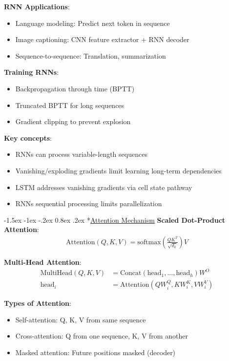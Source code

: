 \documentclass{article}
\makeatletter
\renewcommand\section{\@startsection{section}{1}{\z@}%
                                  {-1.5ex \@plus -1ex \@minus -.2ex}%
                                  {0.8ex \@plus.2ex}%
                                  {\normalfont\small\bfseries}}
\makeatother
\begin{document}
\begin{multicols}{3}
\textbf{RNN Applications}:
\begin{itemize}
\item Language modeling: Predict next token in sequence
\item Image captioning: CNN feature extractor + RNN decoder
\item Sequence-to-sequence: Translation, summarization
\end{itemize}

\textbf{Training RNNs}:
\begin{itemize}
\item Backpropagation through time (BPTT)
\item Truncated BPTT for long sequences
\item Gradient clipping to prevent explosion
\end{itemize}

\textbf{Key concepts}:
\begin{itemize}
\item RNNs can process variable-length sequences
\item Vanishing/exploding gradients limit learning long-term dependencies
\item LSTM addresses vanishing gradients via cell state pathway
\item RNNs sequential processing limits parallelization
\end{itemize}

\section*{\underline{Attention Mechanism}}
\textbf{Scaled Dot-Product Attention}:
\begin{align*}
\text{Attention}(Q, K, V) = \text{softmax}\left(\frac{QK^T}{\sqrt{d_k}}\right)V
\end{align*}

\textbf{Multi-Head Attention}:
\begin{align*}
\text{MultiHead}(Q, K, V) &= \text{Concat}(\text{head}_1,...,\text{head}_h)W^O\\
\text{head}_i &= \text{Attention}(QW_i^Q, KW_i^K, VW_i^V)
\end{align*}

\textbf{Types of Attention}:
\begin{itemize}
\item Self-attention: Q, K, V from same sequence
\item Cross-attention: Q from one sequence, K, V from another
\item Masked attention: Future positions masked (decoder)
\end{itemize}


\end{multicols}
\end{document}
